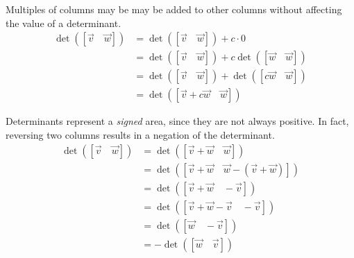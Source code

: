 \begin{applicationActivities}{1}{25}
\begin{observation}
Multiples of columns may be may be added to other
columns without affecting the value of a determinant.
  \begin{align*}
  \det([\vec{v}\hspace{1em}\vec{w}])
&=
  \det([\vec{v}\hspace{1em}\vec{w}])+
  c\cdot 0
\\ &=
  \det([\vec{v}\hspace{1em}\vec{w}])+
  c\det([\vec{w}\hspace{1em}\vec{w}])
\\ &=
  \det([\vec{v}\hspace{1em}\vec{w}])+
  \det([c\vec{w}\hspace{1em}\vec{w}])
\\ &=
  \det([\vec{v}+c\vec{w}\hspace{1em}\vec{w}])
  \end{align*}
\end{observation}

\begin{observation}
Determinants represent a \textit{signed} area, since they are not always
positive. In fact, reversing two columns results in a negation of the
determinant.
  \begin{align*}
  \det([\vec{v}\hspace{1em}\vec{w}])
&=
  \det([\vec{v}+\vec{w}\hspace{1em}\vec{w}])
\\ &=
  \det([\vec{v}+\vec{w}\hspace{1em}\vec{w}-(\vec{v}+\vec{w})])
\\ &=
  \det([\vec{v}+\vec{w}\hspace{1em}-\vec{v}])
\\ &=
  \det([\vec{v}+\vec{w}-\vec{v}\hspace{1em}-\vec{v}])
\\ &=
  \det([\vec{w}\hspace{1em}-\vec{v}])
\\ &=
  -\det([\vec{w}\hspace{1em}\vec{v}])
  \end{align*}
\end{observation}




\end{applicationActivities}
